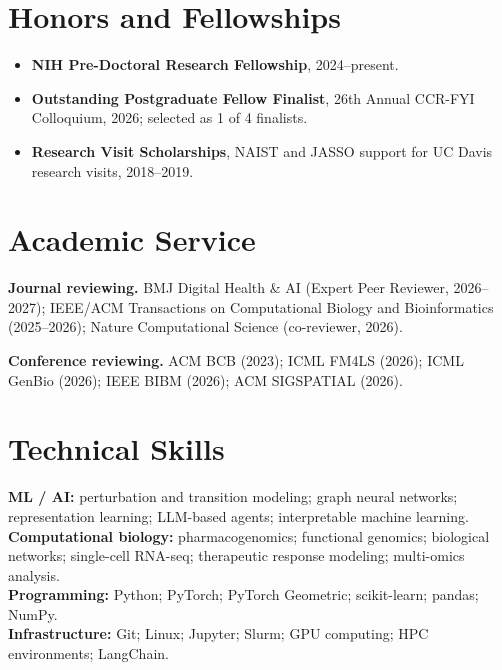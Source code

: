\documentclass[10pt,letterpaper]{article}
\begin{document}
\section{Honors and Fellowships}
\begin{itemize}
  \item \textbf{NIH Pre-Doctoral Research Fellowship}, 2024--present.
  \item \textbf{Outstanding Postgraduate Fellow Finalist}, 26th Annual CCR-FYI Colloquium, 2026; selected as 1 of 4 finalists.
  \item \textbf{Research Visit Scholarships}, NAIST and JASSO support for UC Davis research visits, 2018--2019.
\end{itemize}

\section{Academic Service}
{\small
\textbf{Journal reviewing.}
BMJ Digital Health \& AI (Expert Peer Reviewer, 2026--2027);
IEEE/ACM Transactions on Computational Biology and Bioinformatics (2025--2026);
Nature Computational Science (co-reviewer, 2026).

\vspace{2pt}
\textbf{Conference reviewing.}
ACM BCB (2023); ICML FM4LS (2026); ICML GenBio (2026); IEEE BIBM (2026); ACM SIGSPATIAL (2026).
}

\section{Technical Skills}
{\small
\textbf{ML / AI:} perturbation and transition modeling; graph neural networks; representation learning; LLM-based agents; interpretable machine learning.\\
\textbf{Computational biology:} pharmacogenomics; functional genomics; biological networks; single-cell RNA-seq; therapeutic response modeling; multi-omics analysis.\\
\textbf{Programming:} Python; PyTorch; PyTorch Geometric; scikit-learn; pandas; NumPy.\\
\textbf{Infrastructure:} Git; Linux; Jupyter; Slurm; GPU computing; HPC environments; LangChain.
}
\end{document}
